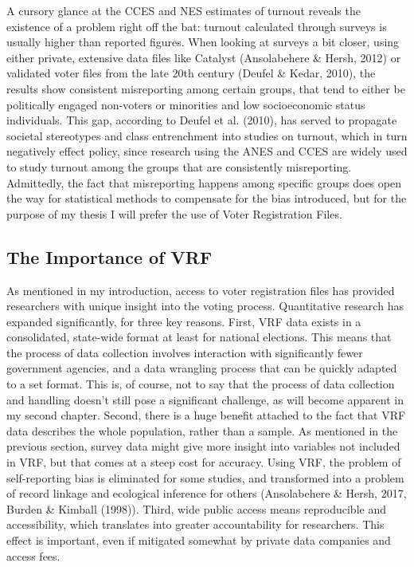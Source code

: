 \documentclass[12pt,twoside]{reedthesis}
\begin{document}
  A cursory glance at the CCES and NES estimates of turnout reveals the
  existence of a problem right off the bat: turnout calculated through
  surveys is usually higher than reported figures. When looking at surveys
  a bit closer, using either private, extensive data files like Catalyst
  (Ansolabehere \& Hersh, 2012) or validated voter files from the late
  20th century (Deufel \& Kedar, 2010), the results show consistent
  misreporting among certain groups, that tend to either be politically
  engaged non-voters or minorities and low socioeconomic status
  individuals. This gap, according to Deufel et al. (2010), has served to
  propagate societal stereotypes and class entrenchment into studies on
  turnout, which in turn negatively effect policy, since research using
  the ANES and CCES are widely used to study turnout among the groups that
  are consistently misreporting. Admittedly, the fact that misreporting
  happens among specific groups does open the way for statistical methods
  to compensate for the bias introduced, but for the purpose of my thesis
  I will prefer the use of Voter Registration Files.
  
  \subsection{The Importance of VRF}\label{the-importance-of-vrf}
  
  As mentioned in my introduction, access to voter registration files has
  provided researchers with unique insight into the voting process.
  Quantitative research has expanded significantly, for three key reasons.
  First, VRF data exists in a consolidated, state-wide format at least for
  national elections. This means that the process of data collection
  involves interaction with significantly fewer government agencies, and a
  data wrangling process that can be quickly adapted to a set format. This
  is, of course, not to say that the process of data collection and
  handling doesn't still pose a significant challenge, as will become
  apparent in my second chapter. Second, there is a huge benefit attached
  to the fact that VRF data describes the whole population, rather than a
  sample. As mentioned in the previous section, survey data might give
  more insight into variables not included in VRF, but that comes at a
  steep cost for accuracy. Using VRF, the problem of self-reporting bias
  is eliminated for some studies, and transformed into a problem of record
  linkage and ecological inference for others (Ansolabehere \& Hersh,
  2017, Burden \& Kimball (1998)). Third, wide public access means
  reproducible and accessibility, which translates into greater
  accountability for researchers. This effect is important, even if
  mitigated somewhat by private data companies and access fees.
  
\end{document}
